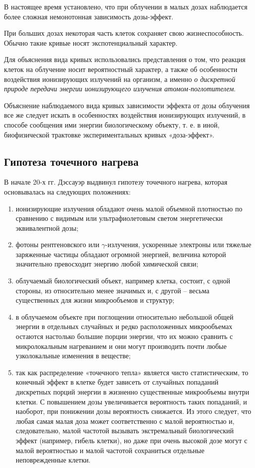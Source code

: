 \documentclass[a4paper, 14pt]{article}
\begin{document}
В настоящее время установлено, что при облучении в малых дозах наблюдается
более сложная немонотонная зависимость дозы-эффект.

При больших дозах некоторая часть клеток сохраняет свою жизнеспособность.
Обычно такие кривые носят экспотенциальный характер. %

Для объяснения вида кривых использовались представления о том, что реакция
клеток на облучение носит вероятностный характер, а также об особенности
воздействия ионизирующих излучений на организм, а именно \textit{о дискретной природе
передачи энергии ионизирующего излучения атомом-поглотителем}.

Объяснение наблюдаемого вида кривых зависимости эффекта от дозы
облучения все же следует искать в особенностях воздействия ионизирующих
излучений, в способе сообщения ими энергии биологическому объекту, т. е. в иной,
биофизической трактовке экспериментальных кривых «доза-эффект».

\subsection{Гипотеза точечного нагрева}
В начале 20-х гг. Дэссауэр выдвинул гипотезу точечного нагрева, которая
основывалась на следующих положениях:
\begin{enumerate}
    \item ионизирующие излучения обладают очень малой объемной плотностью по
    сравнению с видимым или ультрафиолетовым светом энергетически эквивалентной
    дозы;
    \item фотоны рентгеновского или $\gamma$-излучения, ускоренные электроны или
    тяжелые заряженные частицы обладают огромной энергией, величина которой
    значительно превосходит энергию любой химической связи;
    \item облучаемый биологический объект, например клетка, состоит, с одной
    стороны, из относительно менее значимых и, с другой – весьма существенных для
    жизни микрообъемов и структур;
    \item в облучаемом объекте при поглощении относительно небольшой общей энергии в отдельных случайных и редко расположенных микрообъемах остаются
    настолько большие порции энергии, что их можно сравнить с микролокальным
    нагреванием и они могут производить почти любые узколокальные изменения в
    веществе;
    \item так как распределение «точечного тепла» является чисто статистическим,
    то конечный эффект в клетке будет зависеть от случайных попаданий дискретных
    порций энергии в жизненно существенные микрообъемы внутри клетки. С
    повышением дозы увеличивается вероятность таких попаданий, и наоборот, при
    понижении дозы вероятность снижается. Из этого следует, что любая самая малая доза
    может соответственно с малой вероятностью и, следовательно, малой частотой
    вызывать экстремальный биологический эффект (например, гибель клетки), но даже
    при очень высокой дозе могут с малой вероятностью и малой частотой сохраниться
    отдельные неповрежденные клетки.
\end{enumerate}
\end{document}
